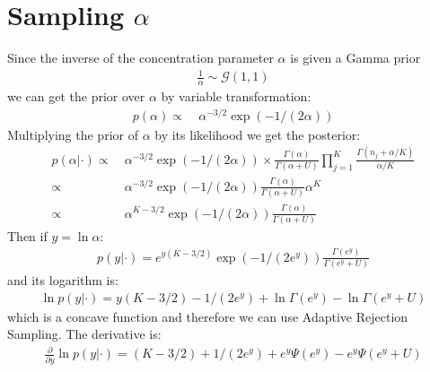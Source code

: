 \documentclass[smallextended]{svjour3}          %
\begin{document}
\section{Sampling $\alpha$}
Since the inverse of the concentration parameter $\alpha$ is given a Gamma prior
\begin{align*}
	\frac{1}{\alpha} \sim \mathcal{G}(1,1)
\end{align*}
we can get the prior over $\alpha$ by variable transformation:
\begin{align*}
p(\alpha) 
\propto~& 
\alpha^{-3/2} \exp \left(-1/(2\alpha)\right)
\end{align*}
Multiplying the prior of $\alpha$ by its likelihood we get the posterior:
\begin{align*}
	p(\alpha | \cdot) 
	\propto~& 
	\alpha^{-3/2} \exp \left(-1/(2\alpha)\right)
	\times
	\frac{\Gamma(\alpha)}{\Gamma(\alpha+U)}
	\prod_{j=1}^{K}
	\frac{\Gamma(n_j + \alpha/K)}{\alpha/K}\\
	\propto~& 
	\alpha^{-3/2} \exp \left(-1/(2\alpha)\right)
	\frac{\Gamma(\alpha)}{\Gamma(\alpha+U)}\alpha^K \\
	\propto~&\alpha^{K-3/2} \exp \left(-1/(2\alpha)\right)
	\frac{\Gamma(\alpha)}{\Gamma(\alpha+U)}
\end{align*}
Then if $y=\ln \alpha$:
\begin{align*}
p(y | \cdot) = e^{y(K-3/2)}
\exp(-1/(2e^y))
\frac{\Gamma(e^y)}{\Gamma(e^y +U)}
\end{align*}
and its logarithm is:
\begin{align*}
\ln p(y | \cdot) = 
y(K-3/2)
-1/(2e^y)+
\ln\Gamma(e^y) - \ln\Gamma(e^y+U)
\end{align*}
which is a concave function and therefore we can use Adaptive Rejection Sampling. The derivative is:
\begin{align*}
\frac{\partial}{\partial y} \ln p(y | \cdot) = 
(K-3/2)
+1/(2e^y)+
e^y\Psi(e^y) - e^y\Psi(e^y+U)
\end{align*}

 

\end{document}
